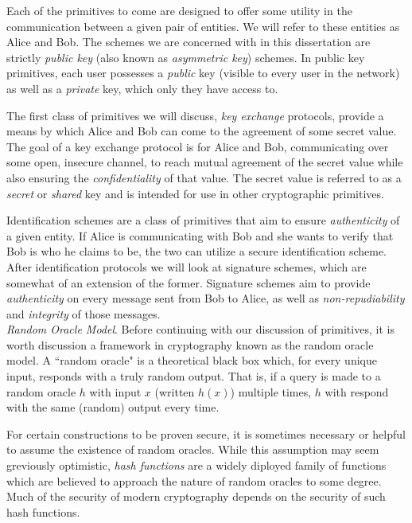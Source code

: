 Each of the primitives to come are designed to offer some utility in the communication between a given pair of entities. We will refer to these entities as Alice and Bob. The schemes we are concerned with in this dissertation are strictly \emph{public key} (also known as \emph{asymmetric key}) schemes. In public key primitives, each user possesses a \emph{public} key (visible to every user in the network) as well as a \emph{private} key, which only they have access to. 

The first class of primitives we will discuss, \emph{key exchange} protocols, provide a means by which Alice and Bob can come to the agreement of some secret value. The goal of a key exchange protocol is for Alice and Bob, communicating over some open, insecure channel, to reach mutual agreement of the secret value while also ensuring the \emph{confidentiality} of that value. The secret value is referred to as a \emph{secret} or \emph{shared} key and is intended for use in other cryptographic primitives. 

Identification schemes are a class of primitives that aim to ensure \emph{authenticity} of a given entity. If Alice is communicating with Bob and she wants to verify that Bob is who he claims to be, the two can utilize a secure identification scheme. After identification protocols we will look at signature schemes, which are somewhat of an extension of the former. Signature schemes aim to provide \emph{authenticity} on every message sent from Bob to Alice, as well as \emph{non-repudiability} and \emph{integrity} of those messages.\\

\noindent
\emph{Random Oracle Model}. Before continuing with our discussion of primitives, it is worth discussion a framework in cryptography known as the random oracle model. A ``random oracle" is a theoretical black box which, for every unique input, responds with a truly random output. That is, if a query is made to a random oracle $h$ with input $x$ (written $h(x)$) multiple times, $h$ with respond with the same (random) output every time.

For certain constructions to be proven secure, it is sometimes necessary or helpful to assume the existence of random oracles. While this assumption may seem greviously optimistic, \emph{hash functions} are a widely diployed family of functions which are believed to approach the nature of random oracles to some degree. Much of the security of modern cryptography depends on the security of such hash functions.

